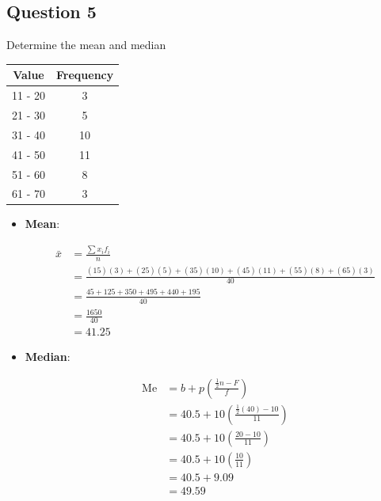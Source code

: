 \documentclass[12pt,titlepage]{article}
\begin{document}
\pagebreak

\subsection{Question 5}
Determine the mean and median

\begin{center}
    \begin{tabular}{|c|c|}
        \hline
        Value & Frequency \\
        \hline
        11 - 20 & 3 \\
        \hline
        21 - 30 & 5 \\
        \hline
        31 - 40 & 10 \\
        \hline
        41 - 50 & 11 \\
        \hline
        51 - 60 & 8 \\
        \hline
        61 - 70 & 3 \\
        \hline
    \end{tabular}
\end{center}

\begin{itemize}
    \item {
        \textbf{Mean}:

        \begin{align*}
            \bar{x} &= \frac{\sum x_i f_i}{n}\\
            &= \frac{(15)(3) + (25)(5) + (35)(10) + (45)(11) + (55)(8) + (65)(3)}{40} \\
            &= \frac{45 + 125 + 350 + 495 + 440 + 195}{40} \\
            &= \frac{1650}{40} \\
            &= 41.25
        \end{align*}
    }
    \item {
        \textbf{Median}:

        \begin{align*}
            \text{Me} &= b + p \left( \frac{\frac{1}{2}n - F}{f} \right)\\
            &= 40.5 + 10 \left( \frac{\frac{1}{2}(40) - 10}{11} \right) \\
            &= 40.5 + 10 \left( \frac{20 - 10}{11} \right) \\
            &= 40.5 + 10 \left( \frac{10}{11} \right) \\
            &= 40.5 + 9.09 \\
            &= 49.59
        \end{align*}
    }
\end{itemize}
\end{document}
